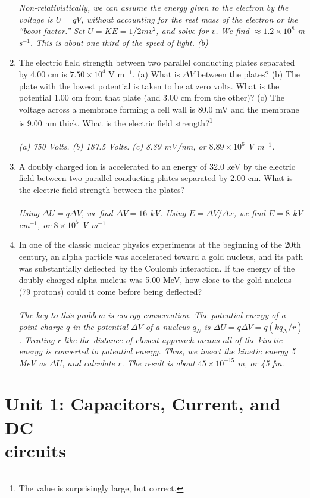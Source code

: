 \documentclass[12pt,twocolumn]{article}
\begin{document}
\begin{enumerate}
\textit{Non-relativistically, we can assume the energy given to the electron by the voltage is $U = qV$, without accounting for the rest mass of the electron or the ``boost factor.''  Set $U = KE = 1/2 m v^2$, and solve for $v$.  We find $\approx 1.2 \times 10^{8}$ m s$^{-1}$.  This is about one third of the speed of light. (b) }
\item The electric field strength between two parallel conducting plates separated by 4.00 cm is $7.50 \times 10^4$ V m$^{-1}$. (a) What is $\Delta V$ between the plates? (b) The plate with the lowest potential is taken to be at zero volts. What is the potential 1.00 cm from that plate (and 3.00 cm from the other)? (c) The voltage across a membrane forming a cell wall is 80.0 mV and the membrane is 9.00 nm thick. What is the electric field strength?\footnote{The value is surprisingly large, but correct.} \\ \\
\textit{(a) 750 Volts.  (b) 187.5 Volts. (c) 8.89 mV/nm, or $8.89 \times 10^{6}$ V m$^{-1}$.}
\item A doubly charged ion is accelerated to an energy of 32.0 keV by the electric field between two parallel conducting plates separated by 2.00 cm. What is the electric field strength between the plates? \\ \\
\textit{Using $\Delta U = q \Delta V$, we find $\Delta V = 16$ kV.  Using $E = \Delta V/\Delta x$, we find $E = 8$ kV cm$^{-1}$, or $8 \times 10^5$ V m$^{-1}$}
\item In one of the classic nuclear physics experiments at the beginning of the 20th century, an alpha particle was accelerated toward a gold nucleus, and its path was substantially deflected by the Coulomb interaction. If the energy of the doubly charged alpha nucleus was 5.00 MeV, how close to the gold nucleus (79 protons) could it come before being deflected? \\ \\
\textit{The key to this problem is energy conservation.  The potential energy of a point charge $q$ in the potential $\Delta V$ of a nucleus $q_N$ is $\Delta U = q \Delta V = q(k q_N/r)$.  Treating $r$ like the distance of closest approach means all of the kinetic energy is converted to potential energy.  Thus, we insert the kinetic energy 5 MeV as $\Delta U$, and calculate $r$.  The result is about $45 \times 10^{-15}$ m, or 45 fm.}
\end{enumerate}

\section{Unit 1: Capacitors, Current, and DC \\ circuits}
\end{document}
